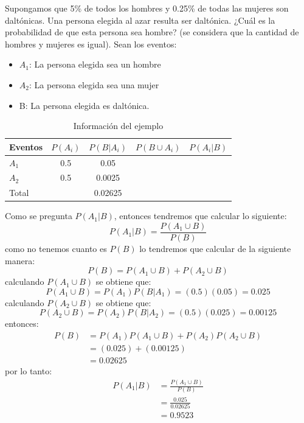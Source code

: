 \begin{ejemplo}
    Supongamos que 5\% de todos los hombres y 0.25\% de todas las mujeres son daltónicas. Una persona elegida al azar resulta ser daltónica. ¿Cuál es la probabilidad de que esta persona sea hombre? (se considera que la cantidad de hombres y mujeres es igual). Sean los eventos:
    \begin{itemize}
        \item $A_1$: La persona elegida sea un hombre
        \item $A_2$: La persona elegida sea una mujer
        \item B: La persona elegida es daltónica.
    \end{itemize}
    \begin{table}[H]
        \centering
        \begin{tabular}{lcccc}
            \hline
            Eventos & $P(A_i)$ & $P(B|A_i)$ & $P(B\cup A_i)$ & $P(A_i|B)$ \\ \hline
            $A_1$   & 0.5      & 0.05       &                &            \\
            $A_2$   & 0.5      & 0.0025     &                &            \\
            Total   &          & 0.02625    &                             \\ \hline
        \end{tabular}
        \caption{Información del ejemplo}
    \end{table}
    Como se pregunta $P(A_1|B)$, entonces tendremos que calcular lo siguiente:
    \begin{equation*}
        P(A_1|B)= \frac{P(A_1 \cup B)}{P(B)}
    \end{equation*}
    como no tenemos cuanto es $P(B)$ lo tendremos que calcular de la siguiente manera:
    \begin{equation*}
        P(B)=P(A_1 \cup B) + P(A_2 \cup B)
    \end{equation*}
    calculando $P(A_1 \cup B)$ se obtiene que:
    \begin{equation*}
        P(A_1 \cup B) = P(A_1)P(B|A_1) =(0.5)(0.05)= 0.025
    \end{equation*}
    calculando $P(A_2 \cup B)$ se obtiene que:
    \begin{equation*}
        P(A_2 \cup B) = P(A_2)P(B|A_2) =(0.5)(0.025) =0.00125
    \end{equation*}
    entonces:
    \begin{align*}
        P(B) & =P(A_1)P(A_1 \cup B) + P(A_2)P(A_2 \cup B) \\
             & = (0.025)+(0.00125)                        \\
             & = 0.02625
    \end{align*}
    por lo tanto:
    \begin{align*}
        P(A_1|B) & = \frac{P(A_1 \cup B)}{P(B)} \\
                 & = \frac{0.025}{0.02625}      \\
                 & = 0.9523
    \end{align*}
\end{ejemplo}
